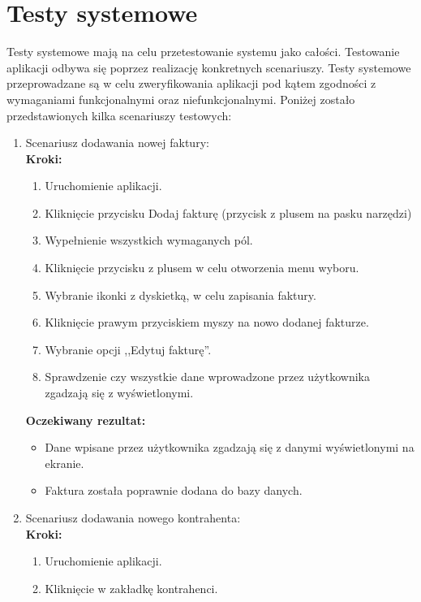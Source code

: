 \chapter{Testy systemowe}
Testy systemowe mają na celu przetestowanie systemu jako całości. Testowanie aplikacji odbywa się poprzez realizację konkretnych scenariuszy. Testy systemowe przeprowadzane są w celu zweryfikowania aplikacji pod kątem zgodności z wymaganiami funkcjonalnymi oraz niefunkcjonalnymi. Poniżej zostało przedstawionych kilka scenariuszy testowych:
\\
\begin{enumerate}
    \item Scenariusz dodawania nowej faktury: \\
        \textbf{Kroki:}
        \begin{enumerate}
            \item Uruchomienie aplikacji.
            \item Kliknięcie przycisku Dodaj fakturę (przycisk z plusem na pasku narzędzi)
            \item Wypełnienie wszystkich wymaganych pól. 
            \item Kliknięcie przycisku z plusem w celu otworzenia menu wyboru.
            \item Wybranie ikonki z dyskietką, w celu zapisania faktury.
            \item Kliknięcie prawym przyciskiem myszy na nowo dodanej fakturze.
            \item Wybranie opcji ,,Edytuj fakturę''.
            \item Sprawdzenie czy wszystkie dane wprowadzone przez użytkownika zgadzają się z wyświetlonymi.
        \end{enumerate}
        \textbf{Oczekiwany rezultat:}
        \begin{itemize}
            \item Dane wpisane przez użytkownika zgadzają się z danymi wyświetlonymi na ekranie.
            \item Faktura została poprawnie dodana do bazy danych.\\
        \end{itemize}
    \item Scenariusz dodawania nowego kontrahenta: \\
        \textbf{Kroki:}
        \begin{enumerate}
            \item Uruchomienie aplikacji.
            \item Kliknięcie w zakładkę kontrahenci.

\end{enumerate}
\end{enumerate}
